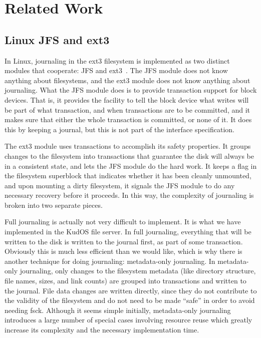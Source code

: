 \section{Related Work}
\label{sec:related}

\subsection{Linux JFS and ext3}
\label{sec:related:ext3}

In Linux, journaling in the ext3 filesystem is implemented as two distinct
modules that cooperate: JFS and ext3~\cite{tweedie98journaling}. The JFS module
does not know anything about filesystems, and the ext3 module does not know
anything about journaling. What the JFS module does is to provide transaction
support for block devices. That is, it provides the facility to tell the block
device what writes will be part of what transaction, and when transactions are
to be committed, and it makes sure that either the whole transaction is
committed, or none of it. It does this by keeping a journal, but this is not
part of the interface specification.

The ext3 module uses transactions to accomplish its safety properties. It groups
changes to the filesystem into transactions that guarantee the disk will always
be in a consistent state, and lets the JFS module do the hard work. It keeps a
flag in the filesystem superblock that indicates whether it has been cleanly
unmounted, and upon mounting a dirty filesystem, it signals the JFS module to do
any necessary recovery before it proceeds. In this way, the complexity of
journaling is broken into two separate pieces.

Full journaling is actually not very difficult to implement. It is what we have
implemented in the KudOS file server. In full journaling, everything that will
be written to the disk is written to the journal first, as part of some
transaction. Obviously this is much less efficient than we would like, which is
why there is another technique for doing journaling: metadata-only journaling.
In metadata-only journaling, only changes to the filesystem metadata (like
directory structure, file names, sizes, and link counts) are grouped into
transactions and written to the journal. File data changes are written directly,
since they do not contribute to the validity of the filesystem and do not need
to be made ``safe'' in order to avoid needing fsck. Although it seems simple
initially, metadata-only journaling introduces a large number of special cases
involving resource reuse which greatly increase its complexity and the necessary
implementation time.

